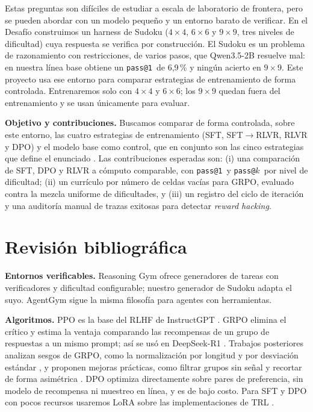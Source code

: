 \documentclass[letterpaper,11pt]{article}
\makeatletter
\newcommand{\passuno}{\texttt{pass@1}}
\newcommand{\passk}{\texttt{pass@}\ensuremath{k}}
\makeatother
\begin{document}
Estas preguntas son difíciles de estudiar a escala de laboratorio de frontera, pero se pueden abordar con un modelo pequeño y un entorno barato de verificar. En el Desafío construimos un harness de Sudoku ($4\times4$, $6\times6$ y $9\times9$, tres niveles de dificultad) cuya respuesta se verifica por construcción. El Sudoku es un problema de razonamiento con restricciones, de varios pasos, que Qwen3.5-2B resuelve mal: en nuestra línea base obtiene un \passuno\ de 6,9\,\% y ningún acierto en $9\times9$. Este proyecto usa ese entorno para comparar estrategias de entrenamiento de forma controlada. Entrenaremos solo con $4\times4$ y $6\times6$; los $9\times9$ quedan fuera del entrenamiento y se usan únicamente para evaluar.

\textbf{Objetivo y contribuciones.} Buscamos comparar de forma controlada, sobre este entorno, las cuatro estrategias de entrenamiento (SFT, SFT$\to$RLVR, RLVR y DPO) y el modelo base como control, que en conjunto son las cinco estrategias que define el enunciado \citep{enunciadoproyecto2026}. Las contribuciones esperadas son: (i) una comparación de SFT, DPO y RLVR a cómputo comparable, con \passuno\ y \passk\ por nivel de dificultad; (ii) un currículo por número de celdas vacías para GRPO, evaluado contra la mezcla uniforme de dificultades, y (iii) un registro del ciclo de iteración y una auditoría manual de trazas exitosas para detectar \emph{reward hacking}.

\section{Revisión bibliográfica}
\textbf{Entornos verificables.} Reasoning Gym \citep{stojanovski2025reasoninggym} ofrece generadores de tareas con verificadores y dificultad configurable; nuestro generador de Sudoku adapta el suyo. AgentGym \citep{xi2025agentgym} sigue la misma filosofía para agentes con herramientas.

\textbf{Algoritmos.} PPO \citep{schulman2017ppo} es la base del RLHF de InstructGPT \citep{ouyang2022instructgpt}. GRPO \citep{shao2024deepseekmath} elimina el crítico y estima la ventaja comparando las recompensas de un grupo de respuestas a un mismo prompt; así se usó en DeepSeek-R1 \citep{deepseekr1}. Trabajos posteriores analizan sesgos de GRPO, como la normalización por longitud y por desviación estándar \citep{liu2025drgrpo}, y proponen mejoras prácticas, como filtrar grupos sin señal y recortar de forma asimétrica \citep{yu2025dapo}. DPO \citep{rafailov2023dpo} optimiza directamente sobre pares de preferencia, sin modelo de recompensa ni muestreo en línea, y es de bajo costo. Para SFT y DPO con pocos recursos usaremos LoRA \citep{hu2022lora} sobre las implementaciones de TRL \citep{vonwerra2020trl}.
\end{document}
